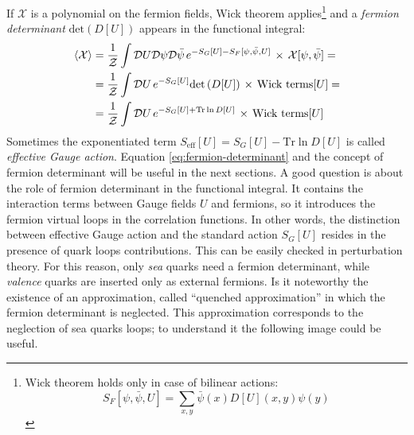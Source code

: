 \documentclass[english, LaM, oneside, noexaminfo]{sapthesis}
\newcommand{\la}{\langle}
\newcommand{\ra}{\rangle}
\newcommand{\tr}{\text{Tr}}
\begin{document}
If $\mathcal{X}$ is a polynomial on the fermion fields, Wick theorem applies\footnote{Wick theorem holds only in case of bilinear actions: $$S_F[\psi,\bar\psi ,U] = \sum_{x,y}\bar \psi (x) D[U](x,y) \psi (y)$$ } and a {\it fermion determinant} $\text{det}\left(D[U]\right)$ appears in the functional integral:
\begin{equation}\label{eq:fermion-determinant}
    \begin{aligned}
        \la \mathcal{X} \ra
        & = \frac{1}{\mathcal Z} \int \mathcal{D}U \mathcal{D}\psi \mathcal{D}\bar\psi \hspace*{0.5mm} e^{-S_G[U]-S_F[\psi,\bar\psi ,U]} \hspace*{0.5mm} \times \hspace*{0.5mm} \mathcal{X} [\psi,\bar\psi] = \\
        & = \frac{1}{\mathcal Z} \int \mathcal{D}U \hspace*{0.5mm} e^{-S_G[U]} \text{det}\left(D[U]\right) \hspace*{0.5mm} \times \hspace*{0.5mm} \text{Wick terms}[U] = \\
        & = \frac{1}{\mathcal Z} \int \mathcal{D}U \hspace*{0.5mm} e^{-S_G[U] + \tr \ln D[U]} \hspace*{0.5mm} \times \hspace*{0.5mm} \text{Wick terms}[U]
    \end{aligned}
\end{equation}
Sometimes the exponentiated term $S_\text{eff}[U] = S_G[U] - \tr \ln D[U]$ is called {\it effective Gauge action}.
Equation \ref{eq:fermion-determinant} and the concept of fermion determinant will be useful in the next sections.
A good question is about the role of fermion determinant in the functional integral.
It contains the interaction terms between Gauge fields $U$ and fermions, so it introduces the fermion virtual loops in the correlation functions.
In other words, the distinction between effective Gauge action and the standard action $S_G[U]$ resides in the presence of quark loops contributions.
This can be easily checked in perturbation theory.
For this reason, only {\it sea} quarks need a fermion determinant, while {\it valence} quarks are inserted only as external fermions.
Is it noteworthy the existence of an approximation, called ``quenched approximation'' in which the fermion determinant is neglected.
This approximation corresponds to the neglection of sea quarks loops; to understand it the following image could be useful.
\end{document}
